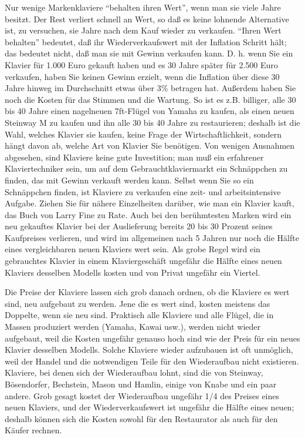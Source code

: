 Nur wenige Markenklaviere \enquote{behalten ihren Wert}, wenn man sie viele Jahre besitzt.
Der Rest verliert schnell an Wert, so daß es keine lohnende Alternative ist, zu versuchen, sie Jahre nach dem Kauf wieder zu verkaufen.
\enquote{Ihren Wert behalten} bedeutet, daß ihr Wiederverkaufswert mit der Inflation Schritt hält; das bedeutet nicht, daß man sie mit Gewinn verkaufen kann.
D. h. wenn Sie ein Klavier für 1.000 Euro gekauft haben und es 30 Jahre später für 2.500 Euro verkaufen, haben Sie keinen Gewinn erzielt, wenn die Inflation über diese 30 Jahre hinweg im Durchschnitt etwas über 3\% betragen hat.
Außerdem haben Sie noch die Kosten für das Stimmen und die Wartung.
So ist es z.B. billiger, alle 30 bis 40 Jahre einen nagelneuen 7ft-Flügel von Yamaha zu kaufen, als einen neuen Steinway M zu kaufen und ihn alle 30 bis 40 Jahre zu restaurieren; deshalb ist die Wahl, welches Klavier sie kaufen, keine Frage der Wirtschaftlichkeit, sondern hängt davon ab, welche Art von Klavier Sie benötigen.
Von wenigen Ausnahmen abgesehen, sind Klaviere keine gute Investition; man muß ein erfahrener Klaviertechniker sein, um auf dem Gebrauchtklaviermarkt ein Schnäppchen zu finden, das mit Gewinn verkauft werden kann.
Selbst wenn Sie so ein Schnäppchen finden, ist Klaviere zu verkaufen eine zeit- und arbeitsintensive Aufgabe.
Ziehen Sie für nähere Einzelheiten darüber, wie man ein Klavier kauft, das Buch von Larry Fine zu Rate.
Auch bei den berühmtesten Marken wird ein neu gekauftes Klavier bei der Auslieferung bereits 20 bis 30 Prozent seines Kaufpreises verlieren, und wird im allgemeinen nach 5 Jahren nur noch die Hälfte eines vergleichbaren neuen Klaviers wert sein.
Als grobe Regel wird ein gebrauchtes Klavier in einem Klaviergeschäft ungefähr die Hälfte eines neuen Klaviers desselben Modells kosten und von Privat ungefähr ein Viertel.

Die Preise der Klaviere lassen sich grob danach ordnen, ob die Klaviere es wert sind, neu aufgebaut zu werden.
Jene die es wert sind, kosten meistens das Doppelte, wenn sie neu sind.
Praktisch alle Klaviere und alle Flügel, die in Massen produziert werden (Yamaha, Kawai usw.), werden nicht wieder aufgebaut, weil die Kosten ungefähr genauso hoch sind wie der Preis für ein neues Klavier desselben Modells.
Solche Klaviere wieder aufzubauen ist oft unmöglich, weil der Handel und die notwendigen Teile für den Wiederaufbau nicht existieren.
Klaviere, bei denen sich der Wiederaufbau lohnt, sind die von Steinway, Bösendorfer, Bechstein, Mason und Hamlin, einige von Knabe und ein paar andere.
Grob gesagt kostet der Wiederaufbau ungefähr 1/4 des Preises eines neuen Klaviers, und der Wiederverkaufswert ist ungefähr die Hälfte eines neuen; deshalb können sich die Kosten sowohl für den Restaurator als auch für den Käufer rechnen.



